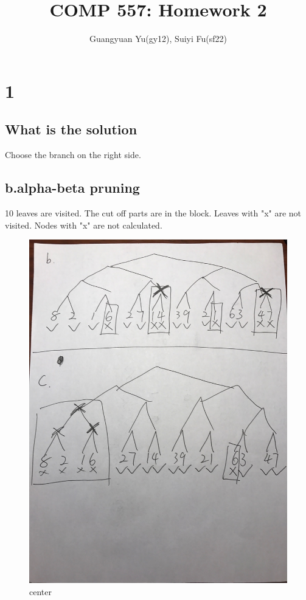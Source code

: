 \documentclass[12pt]{article}
\title{COMP 557: Homework 2}
\author{Guangyuan Yu(gy12), Suiyi Fu(sf22)}
\begin{document}
\maketitle

\section{1}
\subsection{What is the solution}
Choose the branch on the right side.
\subsection{b.alpha-beta pruning}
10 leaves are visited. The cut off parts are in the block. Leaves with "x" are not visited. Nodes with "x" are not calculated.

\begin{figure}[H]
  \caption{center}
  \centering
    \includegraphics[scale=0.2]{3136.jpg}
\end{figure}
\end{document}
